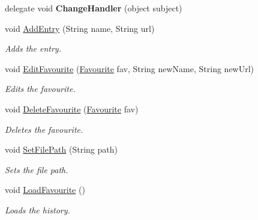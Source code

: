 \begin{DoxyCompactItemize}
\item 
\hypertarget{class_assessment___two___logic_1_1_model_1_1_favourite_handler_a573fd45ff788c9c02dd3ef709fe3bd0f}{
delegate void {\bfseries ChangeHandler} (object subject)}
\label{class_assessment___two___logic_1_1_model_1_1_favourite_handler_a573fd45ff788c9c02dd3ef709fe3bd0f}

\item 
void \hyperlink{class_assessment___two___logic_1_1_model_1_1_favourite_handler_af1c331e6d4db63300367d153b0aff80b}{AddEntry} (String name, String url)
\begin{DoxyCompactList}\small\item\em Adds the entry. \item\end{DoxyCompactList}\item 
void \hyperlink{class_assessment___two___logic_1_1_model_1_1_favourite_handler_aac294d4484f32a31e950366a2ca7df60}{EditFavourite} (\hyperlink{class_assessment___two___logic_1_1_model_1_1_favourite}{Favourite} fav, String newName, String newUrl)
\begin{DoxyCompactList}\small\item\em Edits the favourite. \item\end{DoxyCompactList}\item 
void \hyperlink{class_assessment___two___logic_1_1_model_1_1_favourite_handler_a403150401b89a8c601ddb0bd8214c211}{DeleteFavourite} (\hyperlink{class_assessment___two___logic_1_1_model_1_1_favourite}{Favourite} fav)
\begin{DoxyCompactList}\small\item\em Deletes the favourite. \item\end{DoxyCompactList}\item 
void \hyperlink{class_assessment___two___logic_1_1_model_1_1_favourite_handler_aa2a0d3c296ccd08464966454b4cdd143}{SetFilePath} (String path)
\begin{DoxyCompactList}\small\item\em Sets the file path. \item\end{DoxyCompactList}\item 
void \hyperlink{class_assessment___two___logic_1_1_model_1_1_favourite_handler_a3ac17e67bfbb19f2a9062c1c63bbbe0c}{LoadFavourite} ()
\begin{DoxyCompactList}\small\item\em Loads the history. \item\end{DoxyCompactList}\item 

\end{DoxyCompactItemize}
